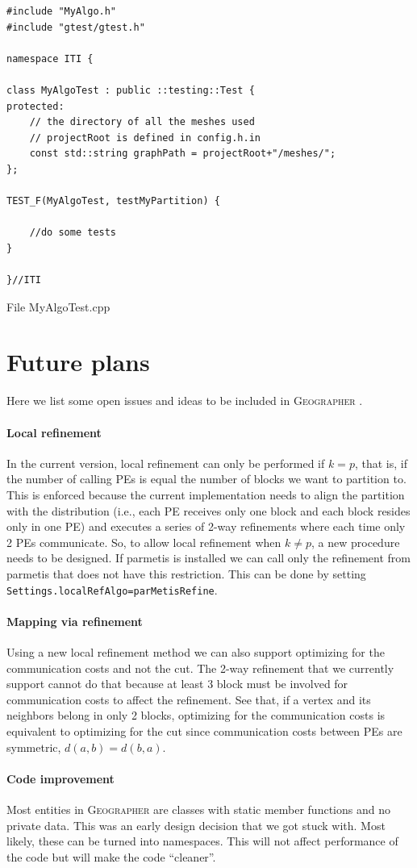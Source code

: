 \documentclass[a4paper,10pt]{article}
\newcommand{\geo}{\textsc{Geographer} }
\newcommand{\quot}[1]{``#1''}
\newcommand{\MI}[1]{\texttt{#1}}
\begin{document}
\begin{algorithm}
\begin{verbatim}
#include "MyAlgo.h"
#include "gtest/gtest.h"

namespace ITI {

class MyAlgoTest : public ::testing::Test {
protected:
    // the directory of all the meshes used
    // projectRoot is defined in config.h.in
    const std::string graphPath = projectRoot+"/meshes/";
};

TEST_F(MyAlgoTest, testMyPartition) {
	
    //do some tests
}

}//ITI
\end{verbatim}
\caption{File MyAlgoTest.cpp}
\label{MyAlgoTest.cpp}
\end{algorithm}

\clearpage

\section*{Future plans}

Here we list some open issues and ideas to be included in \geo.

\paragraph*{Local refinement}
In the current version, local refinement can only be performed if $k=p$, that is, if the number 
of calling PEs is equal the number of blocks we want to partition to. 
This is enforced because the current implementation needs to align the partition with the 
distribution (i.e., each PE receives only one block and each block resides only in one PE) 
and executes a series of 2-way refinements
where each time only 2 PEs communicate. So, to allow local refinement when $k\neq p$, a new
procedure needs to be designed.
If parmetis is installed we can call only the refinement from parmetis that does not have 
this restriction. This can be done by setting \MI{Settings.localRefAlgo=parMetisRefine}.

\paragraph*{Mapping via refinement}
Using a new local refinement method we can also support optimizing for the communication
costs and not the cut. The 2-way refinement that we currently support cannot do that because
at least 3 block must be involved for communication costs to affect the refinement. See that, if
a vertex and its neighbors belong in only 2 blocks, optimizing for the communication costs is 
equivalent to optimizing for the cut since communication costs between PEs are symmetric, 
$d(a,b)=d(b,a)$.

\paragraph*{Code improvement}
Most entities in \geo are classes with static member functions and no private data. This was
an early design decision that we got stuck with. Most likely, these can be turned into namespaces.
This will not affect performance of the code but will make the code \quot{cleaner}.
\end{document}
